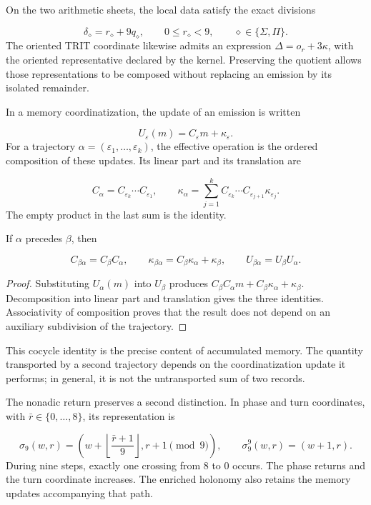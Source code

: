 On the two arithmetic sheets, the local data satisfy the exact divisions

\[
\delta_\diamond=r_\diamond+9q_\diamond,
\qquad 0\leq r_\diamond<9,
\qquad \diamond\in\{\Sigma,\Pi\}.
\]
The oriented TRIT coordinate likewise admits an expression \(\Delta=o_r+3\kappa\), with the oriented representative declared by the kernel. Preserving the quotient allows those representations to be composed without replacing an emission by its isolated remainder.

In a memory coordinatization, the update of an emission is written

\[
U_\varepsilon(m)=C_\varepsilon m+\kappa_\varepsilon.
\]
For a trajectory \(\alpha=(\varepsilon_1,\ldots,\varepsilon_k)\), the effective operation is the ordered composition of these updates. Its linear part and its translation are

\[
C_\alpha=C_{\varepsilon_k}\cdots C_{\varepsilon_1},
\qquad
\kappa_\alpha=
\sum_{j=1}^{k}C_{\varepsilon_k}\cdots
C_{\varepsilon_{j+1}}\kappa_{\varepsilon_j}.
\]
The empty product in the last sum is the identity.

\begin{proposition}
\label{hmtfg:base:prop:continuo-compatibilidad-afin}
If \(\alpha\) precedes \(\beta\), then

\[
C_{\beta\alpha}=C_\beta C_\alpha,
\qquad
\kappa_{\beta\alpha}=C_\beta\kappa_\alpha+\kappa_\beta,
\qquad
U_{\beta\alpha}=U_\beta U_\alpha.
\]
\end{proposition}
\begin{proof}
Substituting \(U_\alpha(m)\) into \(U_\beta\) produces \(C_\beta C_\alpha m+C_\beta\kappa_\alpha+\kappa_\beta\). Decomposition into linear part and translation gives the three identities. Associativity of composition proves that the result does not depend on an auxiliary subdivision of the trajectory.
\end{proof}

This cocycle identity is the precise content of accumulated memory. The quantity transported by a second trajectory depends on the coordinatization update it performs; in general, it is not the untransported sum of two records.

The nonadic return preserves a second distinction. In phase and turn coordinates, with \(\bar r\in\{0,\ldots,8\}\), its representation is

\[
\sigma_9(w,r)=
\left(w+\left\lfloor\frac{\bar r+1}{9}\right\rfloor,
r+1\pmod9\right),
\qquad
\sigma_9^9(w,r)=(w+1,r).
\]
During nine steps, exactly one crossing from \(8\) to \(0\) occurs. The phase returns and the turn coordinate increases. The enriched holonomy also retains the memory updates accompanying that path.

